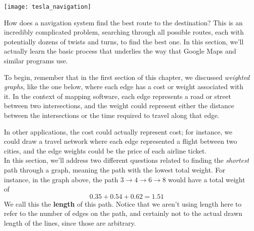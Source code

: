 \setcounter{ExampleCounter}{1}
\begin{center}
\texttt{[image: tesla\_navigation]}
\end{center}
How does a navigation system find the best route to the destination?  This is an incredibly complicated problem, searching through all possible routes, each with potentially dozens of twists and turns, to find the best one.  In this section, we'll actually learn the basic process that underlies the way that Google Maps and similar programs use.

To begin, remember that in the first section of this chapter, we discussed \emph{weighted graphs}, like the one below, where each edge has a cost or weight associated with it.  In the context of mapping software, each edge represents a road or street between two intersections, and the weight could represent either the distance between the intersections or the time required to travel along that edge.
\begin{center}
\end{center}

In other applications, the cost could actually represent cost; for instance, we could draw a travel network where each edge represented a flight between two cities, and the edge weights could be the price of each airline ticket.\\

In this section, we'll address two different questions related to finding the \emph{shortest} path through a graph, meaning the path with the lowest total weight.  For instance, in the graph above, the path $3 \to 4 \to 6 \to 8$ would have a total weight of
\[0.35 + 0.54 + 0.62 = 1.51\]
We call this the \textbf{length} of this path.  Notice that we aren't using length here to refer to the number of edges on the path, and certainly not to the actual drawn length of the lines, since those are arbitrary.

